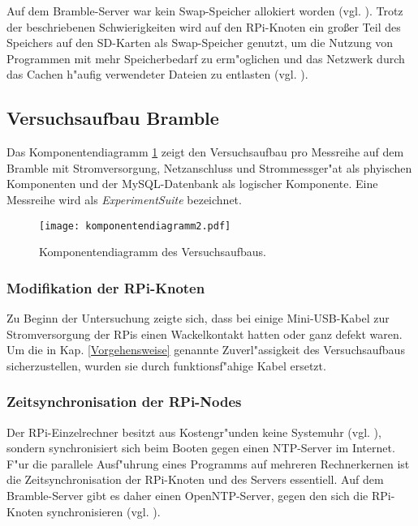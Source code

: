 Auf dem Bramble-Server war kein Swap-Speicher allokiert worden (vgl. \cite{kli13}). Trotz der beschriebenen Schwierigkeiten wird auf den RPi-Knoten ein gro\ss er Teil des Speichers auf den SD-Karten als Swap-Speicher genutzt, um die Nutzung von Programmen mit mehr Speicherbedarf zu erm"oglichen und das Netzwerk durch das Cachen h"aufig verwendeter Dateien zu entlasten (vgl. \cite{kli13}).  

\subsection{Versuchsaufbau Bramble}\label{Bramble-Versuchsaufbau}

Das Komponentendiagramm \ref{fig:Komponentendiagramm} zeigt den Versuchsaufbau pro Messreihe auf dem Bramble mit Stromversorgung, Netzanschluss und Strommessger"at als phyischen Komponenten und der MySQL-Datenbank als logischer Komponente. Eine Messreihe wird als \textit{ExperimentSuite} bezeichnet. 
\begin{figure}[htb]
  \centering
  \texttt{[image: komponentendiagramm2.pdf]}\\ 
  \caption{Komponentendiagramm des Versuchsaufbaus.}
  \label{fig:Komponentendiagramm}		
\end{figure}
\subsubsection{Modifikation der RPi-Knoten}

Zu Beginn der Untersuchung zeigte sich, dass bei einige Mini-USB-Kabel zur Stromversorgung der RPis einen Wackelkontakt hatten oder ganz defekt waren. Um die in Kap. \ref{Vorgehensweise} genannte Zuverl"assigkeit des Versuchsaufbaus sicherzustellen, wurden sie durch funktionsf"ahige Kabel ersetzt. 

\subsubsection{Zeitsynchronisation der RPi-Nodes} 

Der RPi-Einzelrechner besitzt aus Kostengr"unden keine Systemuhr (vgl. \cite{schmi13}), sondern synchronisiert sich beim Booten gegen einen NTP-Server im Internet. F"ur die parallele Ausf"uhrung eines Programms auf mehreren Rechnerkernen ist die Zeitsynchronisation der RPi-Knoten und des Servers essentiell. Auf dem Bramble-Server gibt es daher einen OpenNTP-Server, gegen den sich die RPi-Knoten synchronisieren (vgl. \cite{kli13}). 

